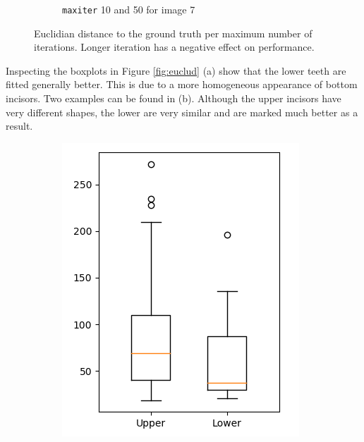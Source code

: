 \documentclass[a4paper,titlepage,12pt]{article}
\begin{document}
\begin{figure}
\begin{subfigure}{0.57\linewidth}
		\caption{\texttt{maxiter} 10 and 50 for image 7}
	\end{subfigure}
	\caption{Euclidian distance to the ground truth per maximum number of iterations. Longer iteration has a negative effect on performance. } %
	\label{fig:euclit}
\end{figure}

Inspecting the boxplots in Figure \ref{fig:euclud} (a) show that the lower teeth are fitted generally better. This is due to a more homogeneous appearance of bottom incisors. Two examples can be found in (b). Although the upper incisors have very different shapes, the lower are very similar and are marked much better as a result. 

\begin{figure}
	\centering
	\begin{subfigure}{0.32\linewidth}
		\centering
		\includegraphics[width=\columnwidth]{results/chart_euclud}
		\caption{}
	\end{subfigure}
	\begin{subfigure}{0.65\linewidth}

\end{subfigure}
\end{figure}
\end{document}

